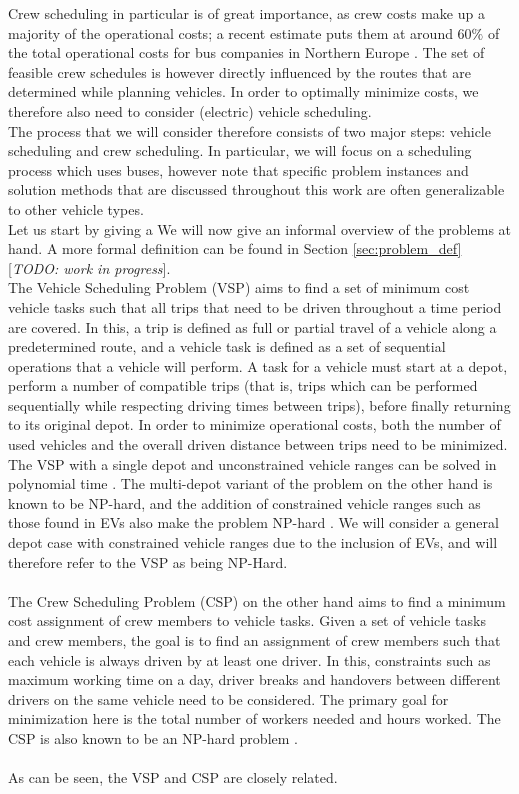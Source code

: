 \documentclass[]{book}
\newcommand{\todo}[1]{{\color{red}[\textit{TODO: #1}]}}
\begin{document}
Crew scheduling in particular is of great
importance, as crew costs make up a majority of the operational costs;
a recent estimate puts them at around $60\%$ of the total operational
costs for bus companies in Northern Europe \cite{Perumal2019Crew}. The set of
feasible crew schedules is however directly influenced by the routes that are
determined while planning vehicles. In order to optimally minimize costs, we therefore also need to consider (electric) vehicle scheduling.
\\
The process that we will consider therefore consists of two major steps: vehicle scheduling and crew scheduling. In particular, we will focus on a scheduling process which uses buses, however note that specific problem instances and solution methods that are discussed throughout this work are often generalizable to other vehicle types. \\
Let us start by giving a
We will now give an informal overview of the
problems at hand. A more formal definition can be found in Section
\ref{sec:problem_def} \todo{work in progress}. \\
The Vehicle Scheduling Problem (VSP) aims to find a set
of minimum cost vehicle tasks such that all trips that need to be driven
throughout a time period are covered. In this, a trip is defined as full or
partial travel of a vehicle along a predetermined route, and a vehicle task is
defined as a set of sequential operations that a vehicle will perform. A task for a
vehicle must start at a depot, perform a number of compatible trips (that is,
trips which can be performed sequentially while respecting driving times
between trips), before finally returning to its original depot. In order to
minimize operational costs, both the number of used vehicles and the overall driven
distance between trips need to be minimized. \\ The VSP
with a single depot and unconstrained vehicle ranges can be solved in
polynomial time \cite{Freling2003SDVSP}. The multi-depot variant of the problem
on the other hand is known to be NP-hard, and the addition of constrained vehicle ranges such as those found
in EVs also make the problem NP-hard \cite{Bodin1983}. We will consider a
general depot case with constrained vehicle ranges due to the inclusion of EVs,
and will therefore refer to the VSP as being NP-Hard. \\\\ The Crew
Scheduling Problem (CSP) on the other hand aims to find a minimum cost
assignment of crew members to vehicle tasks. Given a set of vehicle tasks and
crew members, the goal is to find an assignment of crew members such that each
vehicle is always driven by at least one driver. In this, constraints such as
maximum working time on a day, driver breaks and handovers between different
drivers on the same vehicle need to be considered. The primary goal for
minimization here is the total number of workers needed and hours worked. The
CSP is also known to be an NP-hard problem \cite{Fischetti1989}.\\\\ As can be seen, the VSP and CSP are closely related.  
\end{document}
